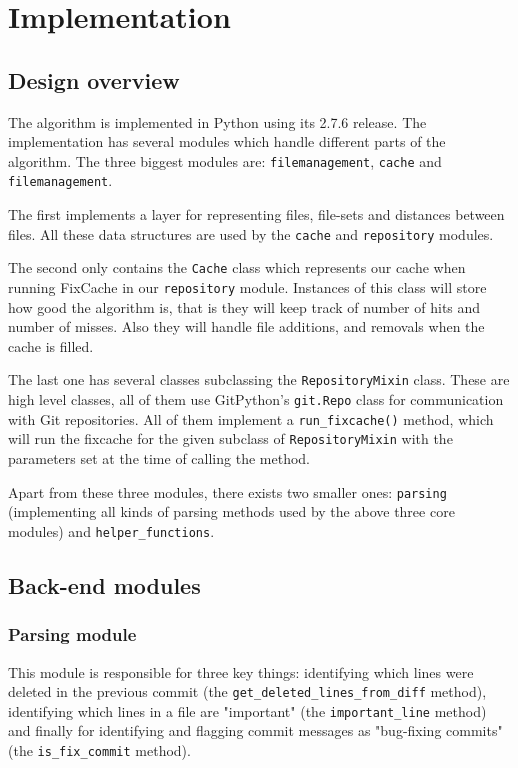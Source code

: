 \documentclass[12pt,twoside,notitlepage]{report}
\newcommand{\fxch}{FixCache }
\begin{document}
\chapter{Implementation}
\section{Design overview}

The algorithm is implemented in Python using its 2.7.6 release. The implementation has several modules which handle different parts of the algorithm. The three biggest modules are: \texttt{filemanagement}, \texttt{cache} and \texttt{filemanagement}. 

The first implements a layer for representing files, file-sets and distances between files. All these data structures are used by the \texttt{cache} and \texttt{repository} modules. 

The second only contains the \texttt{Cache} class which represents our cache when running \fxch in our \texttt{repository} module. Instances of this class will store how good the algorithm is, that is they will keep track of number of hits and number of misses. Also they will handle file additions, and removals when the cache is filled.

The last one has several classes subclassing the \texttt{RepositoryMixin} class. These are high level classes, all of them use GitPython's \texttt{git.Repo} class for communication with Git repositories. All of them implement a \texttt{run\_fixcache()} method, which will run the fixcache for the given subclass of \texttt{RepositoryMixin} with the parameters set at the time of calling the method. 

Apart from these three modules, there exists two smaller ones: \texttt{parsing} (implementing all kinds of parsing methods used by the above three core modules) and \texttt{helper\_functions}.
\section{Back-end modules}
\subsection{Parsing module}\label{parsing}
This module is responsible for three key things: identifying which lines were deleted in the previous commit (the \texttt{get\_deleted\_lines\_from\_diff} method), identifying which lines in a file are "important" (the \texttt{important\_line} method) and finally for identifying and flagging commit messages as "bug-fixing commits" (the \texttt{is\_fix\_commit} method).
\end{document}
